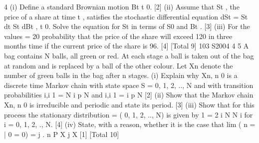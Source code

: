 \documentclass[a4paper,12pt]{article}
\begin{document}
\begin{enumerate}

4 (i) Define a standard Brownian motion {Bt t 0}. [2]
(ii) Assume that St , the price of a share at time t , satisfies the stochastic
differential equation
dSt = St dt St dBt , t 0.
Solve the equation for St in terms of S0 and Bt . [3]
(iii) For the values = 20%
probability that the price of the share will exceed 120 in three months time if
the current price of the share is 96. [4]
[Total 9]
103 S2004 4
5 A bag contains N balls, all green or red. At each stage a ball is taken out of the bag at
random and is replaced by a ball of the other colour. Let Xn denote the number of
green balls in the bag after n stages.
(i) Explain why Xn, n 0 is a discrete time Markov chain with state space
S = {0, 1, 2, .., N} and with transition probabilities
i,i 1 =
N i
p
N
and i,i 1 =
i
p
N
[2]
(ii) Show that the Markov chain Xn, n 0 is irreducible and periodic and state its
period. [3]
(iii) Show that for this process the stationary distribution = ( 0, 1, 2, .., N)
is given by
1
=
2 i N
N
i
for i = 0, 1, 2, ., N. [4]
(iv) State, with a reason, whether it is the case that
lim ( n = | 0 = 0) = j .
n
P X j X [1]
[Total 10]



\end{enumerate}
\end{document}

